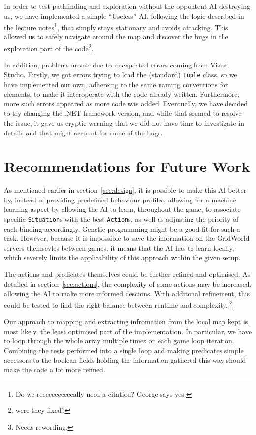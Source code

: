 \documentclass[11pt]{article}
\begin{document}
In order to test pathfinding and exploration without the oppontent AI destroying us, we have implemented a simple ``Useless'' AI, following the logic described in the lecture notes\footnote{Do we reeeeeeeeeeeally need a citation?	George says yes.}, that simply stays stationary and avoids attacking. This allowed us to safely navigate around the map and discover the bugs in the exploration part of the code\footnote{were they fixed?}.

In addition, problems arouse due to unexpected errors coming from Visual Studio. Firstly, we got errors trying to load the (standard) \verb|Tuple| class, so we have implemented our own, adhereing to the same naming conventions for elements, to make it interoperate with the code already written. Furthermore, more such errors appeared as more code was added. Eventually, we have decided to try changing the .NET framework version, and while that seemed to resolve the issue, it gave us cryptic warning that we did not have time to investigate in details and that might account for some of the bugs.

\section{Recommendations for Future Work} \label{sec:futureWork}

As mentioned earlier in section~\ref{sec:design}, it is possible to make this AI better by, instead of providing predefined behaviour profiles, allowing for a machine learning aspect by allowing the AI to learn, throughout the game, to associate specific \verb|Situation|s with the best \verb|Action|s, as well as adjusting the priority of each binding accordingly. Genetic programming might be a good fit for such a task. However, because it is impossible to save the information on the GridWorld servers themsevles between games, it means that the AI has to learn locally, which severely limits the applicability of this approach within the given setup.

The actions and predicates themselves could be further refined and optimised. As detailed in section~\ref{sec:actions}, the complexity of some actions may be increased, allowing the AI to make more informed descions. With additonal refinement, this could be tested to find the right balance between runtime and complexity. \footnote{Needs rewording.}

Our approach to mapping and extracting infromation from the local map kept is, most likely, the least optimised part of the implementation. In particular, we have to loop through the whole array multiple times on each game loop iteration. Combining the tests performed into a single loop and making predicates simple accessors to the boolean fields holding the information gathered this way should make the code a lot more refined.
\end{document}
